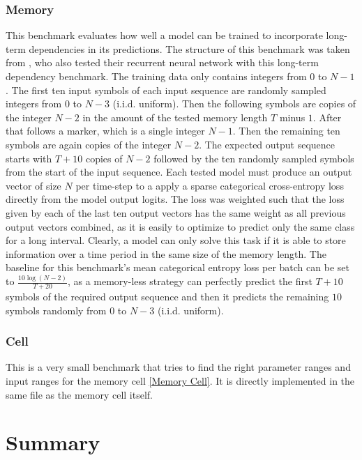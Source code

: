 \documentclass[draft,final]{vutinfth} %
\begin{document}
\subsection{Memory}
This benchmark evaluates how well a model can be trained to incorporate long-term dependencies in its predictions.
The structure of this benchmark was taken from \cite{UnitaryRNNs}, who also tested their recurrent neural network with this long-term dependency benchmark.
The training data only contains integers from $0$ to $N-1$. The first ten input symbols of each input sequence are randomly sampled integers from $0$ to $N-3$ (i.i.d. uniform). 
Then the following symbols are copies of the integer $N-2$ in the amount of the tested memory length $T$ minus $1$. 
After that follows a marker, which is a single integer $N-1$. 
Then the remaining ten symbols are again copies of the integer $N-2$. 
The expected output sequence starts with $T+10$ copies of $N-2$ followed by the ten randomly sampled symbols from the start of the input sequence.
Each tested model must produce an output vector of size $N$ per time-step to a apply a sparse categorical cross-entropy loss directly from the model output logits.
The loss was weighted such that the loss given by each of the last ten output vectors has the same weight as all previous output vectors combined, as it is easily to optimize to predict only the same class for a long interval.
Clearly, a model can only solve this task if it is able to store information over a time period in the same size of the memory length.
The baseline for this benchmark's mean categorical entropy loss per batch can be set to $\frac{10\log(N-2)}{T+20}$, as a memory-less strategy can perfectly predict the first $T+10$ symbols of the required output sequence and then it predicts the remaining $10$ symbols randomly from $0$ to $N-3$ (i.i.d. uniform).
\subsection{Cell}
This is a very small benchmark that tries to find the right parameter ranges and input ranges for the memory cell \ref{Memory Cell}.
It is directly implemented in the same file as the memory cell itself.
\chapter{Summary}

\end{document}

